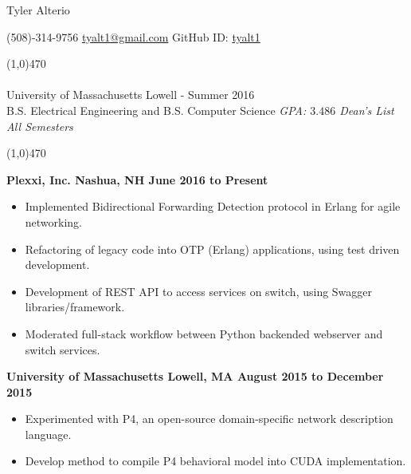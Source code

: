 \documentclass[11pt, a4paper]{article} %
\newcommand{\tinybullet}{ {\tiny \textbullet} }
\begin{document}
\centerline{\Huge \sc Tyler Alterio}

\centerline{
(508)-314-9756 \tinybullet \hspace{1pt}
\href{mailto:tyalt1@gmail.com}{tyalt1@gmail.com} \tinybullet \hspace{1pt}
GitHub ID: \href{http://www.github.com/tyalt1}{tyalt1}
}

\noindent \line(1,0){470}\\

\smallskip \\
University of Massachusetts Lowell - Summer 2016 \\
B.S. Electrical Engineering and B.S. Computer Science
\hfill {\it GPA: $3.486$ \tinybullet \hspace{1pt} Dean's List All Semesters}

\noindent \line(1,0){470}\\

\vspace{5pt}

\centerline{\bf Plexxi, Inc. \tinybullet \hspace{1pt} Nashua, NH \hfill June 2016 to Present}
\begin{itemize}
\itemsep0em
	\item Implemented Bidirectional Forwarding Detection protocol in Erlang for agile networking.
	\item Refactoring of legacy code into OTP (Erlang) applications, using test driven development.
	\item Development of REST API to access services on switch, using Swagger libraries/framework.
	\item Moderated full-stack workflow between Python backended webserver and switch services.
\end{itemize}

\centerline{\bf University of Massachusetts \tinybullet \hspace{1pt} Lowell, MA \hfill August 2015 to December 2015}
\begin{itemize}
\itemsep0em
	\item Experimented with P4, an open-source domain-specific network description language.
	\item Develop method to compile P4 behavioral model into CUDA implementation.
\end{itemize}
\end{document}
